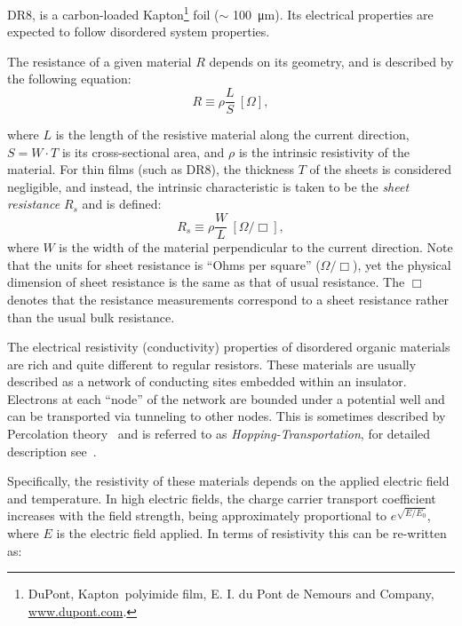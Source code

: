 \documentclass[a4paper,12pt]{article}
\newcommand{\DR}{DR8}
\begin{document}
{\DR}, is a carbon-loaded Kapton\footnote{DuPont\texttrademark, Kapton\textregistered \, polyimide film, E. I. du Pont de Nemours and Company, \url{www.dupont.com}.} foil ($\sim$ \SI{100}{\micro\metre}). 
Its electrical properties are expected to follow disordered system properties. 


The resistance of a given material $R$ depends on its geometry, and is described by the following equation:
\begin{equation}
\label{eq:Res_3D}
    R \equiv \rho \frac{L}{S} \ [\Omega],
\end{equation}

where $L$ is the length of the resistive material along the current direction, $S = W \cdot T$ is its cross-sectional area, and $\rho$ is the intrinsic resistivity of the material. 
For thin films (such as {\DR}), the thickness $T$ of the sheets is considered negligible, and instead, the intrinsic characteristic is taken to be the \emph{sheet resistance} $R_s$ and is defined:
\begin{equation}
\label{eq:res_2D}
    R_s \equiv \rho \frac{W}{L} \ [\Omega / \Box],
\end{equation}
where $W$ is the width of the material perpendicular to the current direction. 
Note that the units for sheet resistance is ``Ohms per square'' ($\Omega / \Box$), yet the physical dimension of sheet resistance is the same as that of usual resistance. 
The $\Box$ denotes that the resistance measurements correspond to a sheet resistance rather than the usual bulk resistance.

The electrical resistivity (conductivity) properties of disordered organic materials are rich and quite different to regular resistors. 
These materials are usually described as a network of conducting sites embedded within an insulator. 
Electrons at each ``node'' of the network are bounded under a potential well and can be transported via tunneling to other nodes. 
This is sometimes described by Percolation theory~\cite{Havlin1996} and is referred to as \emph{Hopping-Transportation}, for detailed description see~\cite{organicDisorderMaterial,electronicPhotonicMaterials}.

Specifically, the resistivity of these materials depends on the applied electric field and temperature.  
In high electric fields, the charge carrier transport coefficient increases with the field strength, being approximately proportional to $e^{\sqrt{E/E_0}}$, where $E$ is the electric field applied. 
In terms of resistivity this can be re-written as:
\end{document}
